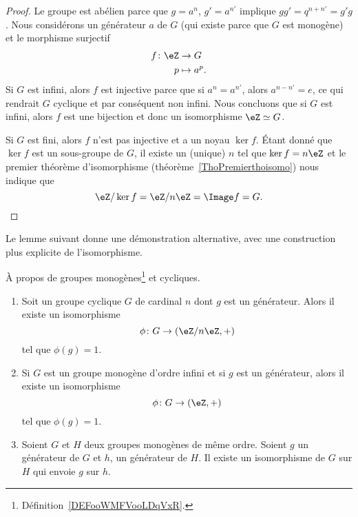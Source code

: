 \begin{proof}
	Le groupe est abélien parce que \( g=a^n\), \( g'=a^{n'}\) implique \( gg'=q^{n+n'}=g'g\). Nous considérons un générateur \( a\) de \( G\) (qui existe parce que \( G\) est monogène) et le morphisme surjectif
	\begin{equation}
		\begin{aligned}
			f\colon \eZ & \to G        \\
			p           & \mapsto a^p.
		\end{aligned}
	\end{equation}
	Si \( G\) est infini, alors \( f\) est injective parce que si \( a^n=a^{n'}\), alors \( a^{n-n'}=e\), ce qui rendrait \( G\) cyclique et par conséquent non infini. Nous concluons que si \( G\) est infini, alors \( f\) est une bijection et donc un isomorphisme \( \eZ\simeq G\).

	Si \( G\) est fini, alors \( f\) n'est pas injective et a un noyau \( \ker f\). Étant donné que \( \ker f\) est un sous-groupe de \( G\), il existe un (unique) \( n\) tel que \( \ker f=n\eZ\) et le premier théorème d'isomorphisme (théorème~\ref{ThoPremierthoisomo}) nous indique que
	\begin{equation}
		\eZ/\ker f=\eZ/n\eZ=\Image f=G.
	\end{equation}

\end{proof}

Le lemme suivant donne une démonstration alternative, avec une construction plus explicite de l'isomorphisme.

\begin{lemma}   \label{LemZhxMit}

	À propos de groupes monogènes\footnote{Définition~\ref{DEFooWMFVooLDqVxR}.} et cycliques.

	\begin{enumerate}
		\item

		      Soit un groupe cyclique \( G\) de cardinal \( n\) dont \( g\) est un générateur. Alors il existe un isomorphisme
		      \begin{equation}
			      \phi\colon G\to (\eZ/n\eZ,+)
		      \end{equation}
		      tel que \( \phi(g)=1\).

		\item

		      Si \( G\) est un groupe monogène d'ordre infini et si \( g\) est un générateur, alors il existe un isomorphisme
		      \begin{equation}
			      \phi\colon G\to (\eZ,+)
		      \end{equation}
		      tel que \( \phi(g)=1\).

		\item

		      Soient \( G\) et \( H\) deux groupes monogènes de même ordre. Soient \( g\) un générateur de \( G\) et \( h\), un générateur de \( H\). Il existe un isomorphisme de \( G\) sur \( H\) qui envoie \( g\) sur \( h\).
	\end{enumerate}
\end{lemma}


